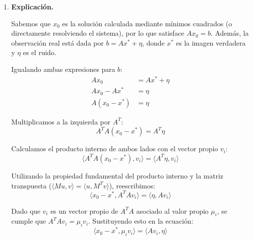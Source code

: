\documentclass{article}
\begin{document}
\begin{enumerate}[label=\roman*., widest=ii]
  Finalmente, el residuo obtenido es \(\|Ax_0-b\|_2=5.626\cdot10^{-12}\), un valor que es prácticamente cero. Gracias a este resultado sabemos que \(x_0\) satisface el sistema \(Ax=b\). Sin embargo, esto no garantiza que la solución obtenida tenga sentido como imagen.

  En conclusión, aunque \(x_0\) satisface el sistema, sus valores no cumplen las condiciones esperadas para una imagen válida, lo que concuerda con la distorsión que se observa en la reconstrucción.

  \item \textbf{Explicación.}

  Sabemos que $x_0$ es la solución calculada mediante mínimos cuadrados (o directamente resolviendo el sistema), por lo que satisface $A x_0 = b$. Además, la observación real está dada por $b = A x^* + \eta$, donde $x^*$ es la imagen verdadera y $\eta$ es el ruido.

  Igualando ambas expresiones para $b$:
  \begin{align*}
  A x_0 &= A x^* + \eta \\
  A x_0 -A x^* &= \eta\\
  A(x_0 - x^*) &= \eta
  \end{align*}

  Multiplicamos a la izquierda por $A^T$:
  \begin{equation*}
  A^T A(x_0 - x^*) = A^T \eta
  \end{equation*}

  Calculamos el producto interno de ambos lados con el vector propio $v_i$:
  \begin{equation*}
  \langle A^T A(x_0 - x^*), v_i \rangle = \langle A^T \eta, v_i \rangle
  \end{equation*}

  Utilizando la propiedad fundamental del producto interno y la matriz transpuesta ($\langle M u, v \rangle = \langle u, M^T v \rangle$), reescribimos:
  \begin{equation*}
  \langle x_0 - x^*, A^T A v_i \rangle = \langle \eta, A v_i \rangle
  \end{equation*}

  Dado que $v_i$ es un vector propio de $A^T A$ asociado al valor propio $\mu_i$, se cumple que $A^T A v_i = \mu_i v_i$. Sustituyendo esto en la ecuación:
  \begin{equation*}
  \langle x_0 - x^*, \mu_i v_i \rangle = \langle A v_i, \eta \rangle
  \end{equation*}


\end{enumerate}
\end{document}
